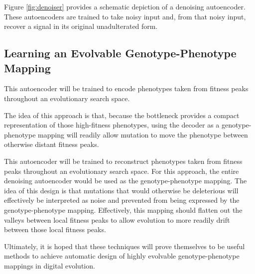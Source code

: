 

Figure \ref{fig:denoiser} provides a schematic depiction of a denoising autoencoder.
These autoencoders are trained to take noisy input and, from that noisy input, recover a signal in its original unadulterated form.

\subsection{Learning an Evolvable Genotype-Phenotype Mapping}


This autoencoder will be trained to encode phenotypes taken from fitness peaks throughout an evolutionary search space.


The idea of this approach is that, because the bottleneck provides a compact representation of those high-fitness phenotypes, using the decoder as a genotype-phenotype mapping will readily allow mutation to move the phenotype between otherwise distant fitness peaks.




This autoencoder will be trained to reconstruct phenotypes taken from fitness peaks throughout an evolutionary search space.
For this approach, the entire denoising autoencoder would be used as the genotype-phenotype mapping.
The idea of this design is that mutations that would otherwise be deleterious will effectively be interpreted as noise and prevented from being expressed by the genotype-phenotype mapping.
Effectively, this mapping should flatten out the valleys between local fitness peaks to allow evolution to more readily drift between those local fitness peaks.


Ultimately, it is hoped that these techniques will prove themselves to be useful methods to achieve automatic design of highly evolvable genotype-phenotype mappings in digital evolution.
